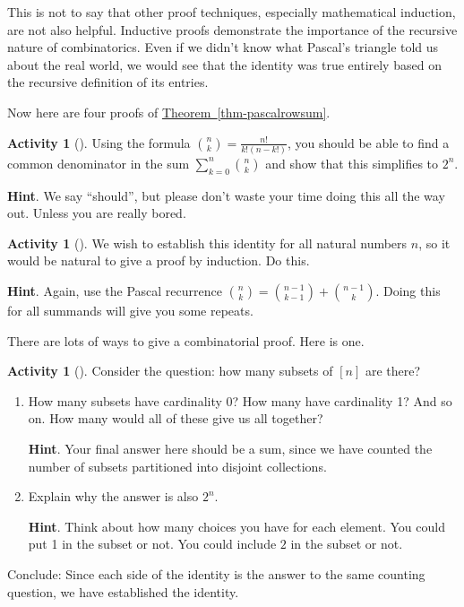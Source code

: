 \documentclass[10pt,]{book}
\theoremstyle{plain}
\theoremstyle{definition}
\theoremstyle{definition}
\theoremstyle{definition}
\newtheorem{activity}[project]{Activity}
\theoremstyle{definition}
\numberwithin{equation}{chapter}
\begin{document}
\par
\hypertarget{p-478}{}%
This is not to say that other proof techniques, especially mathematical induction, are not also helpful.  Inductive proofs demonstrate the importance of the recursive nature of combinatorics.  Even if we didn't know what Pascal's triangle told us about the real world, we would see that the identity was true entirely based on the recursive definition of its entries.%
\par
\hypertarget{p-479}{}%
Now here are four proofs of \hyperref[thm-pascalrowsum]{Theorem~\ref{thm-pascalrowsum}}.%
\begin{activity}[]\label{act-pascalrowsum-alg}
\hypertarget{p-480}{}%
Using the formula \(\binom{n}{k} = \frac{n!}{k!(n-k!)}\), you should be able to find a common denominator in the sum \(\sum_{k=0}^n \binom{n}{k}\) and show that this simplifies to \(2^n\).%
\par\smallskip%
\noindent\textbf{Hint}.\hypertarget{hint-9}{}\quad%
\hypertarget{p-481}{}%
We say ``should'', but please don't waste your time doing this all the way out.  Unless you are really bored.%
\end{activity}
\begin{activity}[]\label{activity-20}
\hypertarget{p-482}{}%
We wish to establish this identity for all natural numbers \(n\), so it would be natural to give a proof by induction.  Do this.%
\par\smallskip%
\noindent\textbf{Hint}.\hypertarget{hint-10}{}\quad%
\hypertarget{p-483}{}%
Again, use the Pascal recurrence \(\binom{n}{k} = \binom{n-1}{k-1} + \binom{n-1}{k}\).  Doing this for all summands will give you some repeats.%
\end{activity}
\hypertarget{p-484}{}%
There are lots of ways to give a combinatorial proof.  Here is one.%
\begin{activity}[]\label{activity-pascalrow-dc}
\hypertarget{p-485}{}%
Consider the question: how many subsets of \([n]\) are there?%
\begin{enumerate}[font=\bfseries,label=(\alph*),ref=\alph*]
\item\label{task-40} \hypertarget{p-486}{}%
How many subsets have cardinality 0?  How many have cardinality 1?  And so on.  How many would all of these give us all together?%
\par\smallskip%
\noindent\textbf{Hint}.\hypertarget{hint-11}{}\quad%
\hypertarget{p-487}{}%
Your final answer here should be a sum, since we have counted the number of subsets partitioned into disjoint collections.%
\item\label{task-41} \hypertarget{p-488}{}%
Explain why the answer is also \(2^n\).%
\par\smallskip%
\noindent\textbf{Hint}.\hypertarget{hint-12}{}\quad%
\hypertarget{p-489}{}%
Think about how many choices you have for each element.  You could put 1 in the subset or not.  You could include \(2\) in the subset or not.%
\end{enumerate}
\bigbreak
\hypertarget{p-490}{}%
Conclude: Since each side of the identity is the answer to the same counting question, we have established the identity.%
\end{activity}
\end{document}
